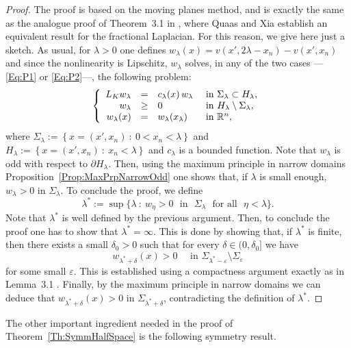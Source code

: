 \begin{proof}
	The proof is based on the moving planes method, and is exactly the same as the analogue proof of Theorem~3.1 in \cite{QuaasXia}, where Quaas and Xia establish an equivalent result for the fractional Laplacian. For this reason, we give here just a sketch. As usual, for $\lambda > 0$ one defines $w_\lambda (x) = v(x',2\lambda - x_n)-v(x',x_n)$ and since the nonlinearity is Lipschitz, $w_\lambda$ solves, in any of the two cases ---\eqref{Eq:P1} or \eqref{Eq:P2}---, the following problem:
	$$
	\left\{\begin{array}{rcll} 
	L_K  w_\lambda &=& c_\lambda(x)\,w_\lambda  &\textrm{ in } \Sigma_\lambda\subset H_\lambda,\\ 
	w_\lambda &\geq& 0 &\textrm{ in } H_\lambda\setminus\Sigma_\lambda,\\ 
	w_\lambda(x) &=& w_\lambda(x_\lambda) &\textrm{ in } \mathbb{R}^n, 
	\end{array} \right. 
	$$
	where $\Sigma_\lambda := \left\{ x = (x',x_n) \ : \ 0<x_n<\lambda \right\}$ and $H_\lambda := \left\{ x = (x',x_n) \ : \ x_n<\lambda \right\}$ and $c_\lambda$ is a bounded function. Note that $w_\lambda$ is odd with respect to $\partial H_\lambda$. Then, using the maximum principle in narrow domains  Proposition~\ref{Prop:MaxPrpNarrowOdd} one shows that, if $\lambda$ is small enough, $w_\lambda>0$ in $\Sigma_\lambda$. To conclude the proof, we define
	$$
	\lambda^* := \sup\{\lambda \ : \ w_\eta>0 \,\, \text{ in } \,\, \Sigma_\lambda \,\, \text{ for all } \,\, \eta<\lambda\}.
	$$
	Note that $\lambda^*$ is well defined by the previous argument. Then, to conclude the proof one has to show that $\lambda^*=\infty$. This is done by showing that, if $\lambda^*$ is finite, then there exists a small $\delta_0 > 0$ such that for every $\delta \in (0,\delta_0]$ we have
	$$
	w_{\lambda^* +  \delta} (x) > 0 \quad \text{ in } \Sigma_{\lambda^*-\varepsilon}\setminus \Sigma_{\varepsilon}
	$$
	for some small $\varepsilon$.
	This is established using a compactness argument exactly as in Lemma~3.1 \cite{QuaasXia}. Finally, by the maximum principle in narrow domains we can deduce that $w_{\lambda^* +  \delta} (x) > 0 $ in $\Sigma_{\lambda^*+\delta}$, contradicting the definition of $\lambda^*$.
\end{proof}








The other important ingredient needed in the proof of Theorem~\ref{Th:SymmHalfSpace} is the following symmetry result.

